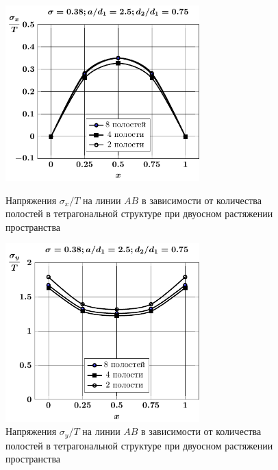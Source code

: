 

\begin{figure}[h!]
\centering\footnotesize
\parbox[b]{7.5cm}{\centering\includegraphics[width=7.5cm]{cav8-4-2-sig_x-spheroids-tension2.pdf}
\caption{Напряжения $\sigma_x/T$ на линии $AB$ в зависимости от количества полостей в тетрагональной структуре при двуосном растяжении пространства
\label{f:9:11}}}\hfil\hfil
\parbox[b]{7.5cm}{\centering\includegraphics[width=7.5cm]{cav8-4-2-sig_y-spheroids-tension2.pdf}
\caption{Напряжения $\sigma_y/T$ на линии $AB$ в зависимости от количества полостей в тетрагональной структуре при двуосном растяжении пространства
\label{f:9:12}}}
\end{figure}

